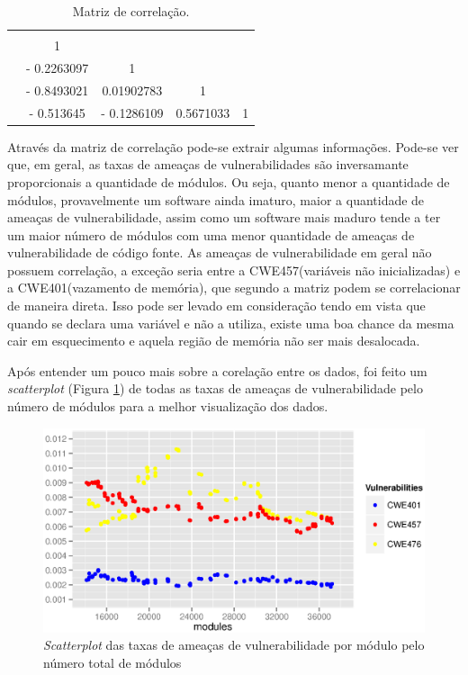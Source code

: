\begin{table}[h]
\centering
\begin{tabular}{ccccl}
 & \cellcolor[HTML]{EFEFEF}{Modules} & \cellcolor[HTML]{EFEFEF}{tax\_CWE476} & \cellcolor[HTML]{EFEFEF}{tax\_CWE457} & \multicolumn{1}{c}{\cellcolor[HTML]{EFEFEF}{tax\_CWE401}} \\
\cellcolor[HTML]{EFEFEF}{Modules} & 1 & \multicolumn{1}{l}{} & \multicolumn{1}{l}{} &  \\
\cellcolor[HTML]{EFEFEF}{tax\_CWE476} & - 0.2263097 & 1 & \multicolumn{1}{l}{} &  \\
\cellcolor[HTML]{EFEFEF}{tax\_CWE457} & - 0.8493021 & 0.01902783 & 1 &  \\
\cellcolor[HTML]{EFEFEF}{tax\_CWE401} & - 0.513645 & - 0.1286109 & 0.5671033 & \multicolumn{1}{c}{1}
\end{tabular}
\caption{Matriz de correlação.}
\label{tab:correlacao}
\end{table}

Através da matriz de correlação pode-se extrair algumas informações. Pode-se ver
que, em geral, as taxas de ameaças de vulnerabilidades são inversamante
proporcionais a quantidade de módulos. Ou seja, quanto menor a quantidade de
módulos, provavelmente um software ainda imaturo, maior a quantidade de ameaças
de vulnerabilidade, assim como um software mais maduro tende a ter um maior
número de módulos com uma menor quantidade de ameaças de vulnerabilidade de
código fonte. As ameaças de vulnerabilidade em geral não possuem correlação, a
exceção seria entre a CWE457(variáveis não inicializadas) e a CWE401(vazamento
de memória), que segundo a matriz podem se correlacionar de maneira direta. Isso
pode ser levado em consideração tendo em vista que quando se declara uma
variável e não a utiliza, existe uma boa chance da mesma cair em esquecimento e
aquela região de memória não ser mais desalocada.

Após entender um pouco mais sobre a corelação entre os dados, foi feito um
\textit{scatterplot} (Figura \ref{fig:scatterplot}) de todas as taxas de ameaças
de vulnerabilidade pelo número de módulos para a melhor visualização dos dados.

\begin{figure}[h]
  \centering
  \includegraphics[width=1.0\textwidth]
      {figuras/scatterplot.eps}
      \caption{\textit{Scatterplot} das taxas de ameaças de vulnerabilidade por
      módulo pelo número total de módulos}
  \label{fig:scatterplot}
\end{figure}


